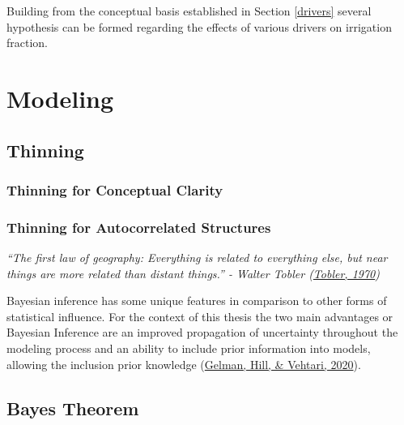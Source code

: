 \documentclass[12pt,twoside]{reedthesis}
\begin{document}
Building from the conceptual basis established in Section \ref{drivers} several hypothesis can be formed regarding the effects of various drivers on irrigation fraction.

\hypertarget{bayesintro}{%
\section{Modeling}\label{bayesintro}}

\hypertarget{thin}{%
\subsection{Thinning}\label{thin}}

\hypertarget{nocrop}{%
\subsubsection{Thinning for Conceptual Clarity}\label{nocrop}}

\hypertarget{autocorr}{%
\subsubsection{Thinning for Autocorrelated Structures}\label{autocorr}}

\emph{``The first law of geography: Everything is related to everything else, but near things are more related than distant things.'' - Walter Tobler (\protect\hyperlink{ref-toblerComputerMovieSimulating1970}{Tobler, 1970})}

Bayesian inference has some unique features in comparison to other forms of statistical influence. For the context of this thesis the two main advantages or Bayesian Inference are an improved propagation of uncertainty throughout the modeling process and an ability to include prior information into models, allowing the inclusion prior knowledge (\protect\hyperlink{ref-gelmanRegressionOtherStories2020}{Gelman, Hill, \& Vehtari, 2020}).

\hypertarget{bayesthe}{%
\subsection{Bayes Theorem}\label{bayesthe}}
\end{document}
